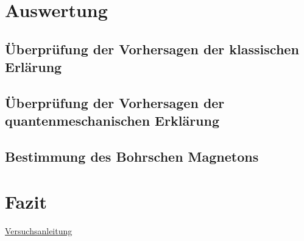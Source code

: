 \documentclass[bigchapter,colorback,accentcolor=tud4b,linedtoc,11pt]{tudreport}
\begin{document}
\chapter{Auswertung}
\section{Überprüfung der Vorhersagen der klassischen Erlärung}
\section{Überprüfung der Vorhersagen der quantenmeschanischen Erklärung}
\section{Bestimmung des Bohrschen Magnetons}
\chapter{Fazit}

\cleardoublepage{}
\newpage
\begin{thebibliography}{100}
   \url{Versuchsanleitung}
\end{thebibliography}
\end{document}
